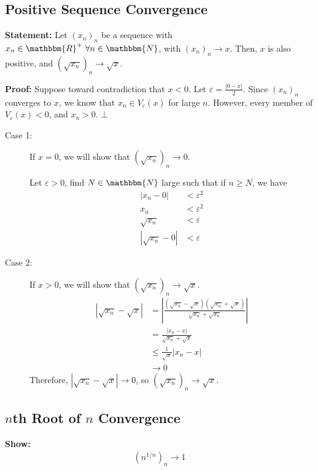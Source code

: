 \documentclass[10pt]{extarticle}
\newcommand{\N}{\mathbbm{N}}
\newcommand{\R}{\mathbbm{R}}
\begin{document}
  \subsection{Positive Sequence Convergence}%
  \textbf{Statement:} Let $(x_n)_n$ be a sequence with $x_n\in\R^+~\forall n\in\N$, with $(x_n)_n \rightarrow x$. Then, $x$ is also positive, and $\left(\sqrt{x_n}\right)_n \rightarrow \sqrt{x}$.

  \textbf{Proof:} Suppose toward contradiction that $x < 0$. Let $\varepsilon = \frac{|0-x|}{2}$. Since $(x_n)_n$ converges to $x$, we know that $x_n\in V_{\varepsilon}(x)$ for large $n$. However, every member of $V_{\varepsilon}(x) < 0$, and $x_n > 0$. $\bot$
    \begin{description}
      \item[Case 1:] If $x = 0$, we will show that $\left(\sqrt{x_n}\right)_n \rightarrow 0$.\newline

        Let $\varepsilon > 0$, find $N\in\N$ large such that if $n\geq N$, we have
        \begin{align*}
          |x_n - 0| &< \varepsilon^2\\
          x_n &< \varepsilon^2\\
          \sqrt{x_n} &< \varepsilon\\
          |\sqrt{x_n} - 0| &< \varepsilon
        \end{align*}
      \item[Case 2:] If $x > 0$, we will show that $\left(\sqrt{x_n}\right)_n \rightarrow \sqrt{x}$.
        \begin{align*}
          \left|\sqrt{x_n} - \sqrt{x}\right| &= \left|\frac{\left(\sqrt{x_n} - \sqrt{x}\right)\left(\sqrt{x_n} + \sqrt{x}\right)}{\sqrt{x_n} + \sqrt{x_n}}\right|\\
                                             &= \frac{|x_n-x|}{\sqrt{x_n} + \sqrt{x}}\\
                                             &\leq \frac{1}{\sqrt{x}} |x_n - x|\\
                                             &\rightarrow 0
        \end{align*}
        Therefore, $|\sqrt{x_n}-\sqrt{x}| \rightarrow 0$, so $\left(\sqrt{x_n}\right)_n \rightarrow \sqrt{x}$.
    \end{description}
  \subsection{$n$th Root of $n$ Convergence}%
    \textbf{Show:}
      \begin{align*}
        \left(n^{1/n}\right)_n \rightarrow 1
      \end{align*}
\end{document}
